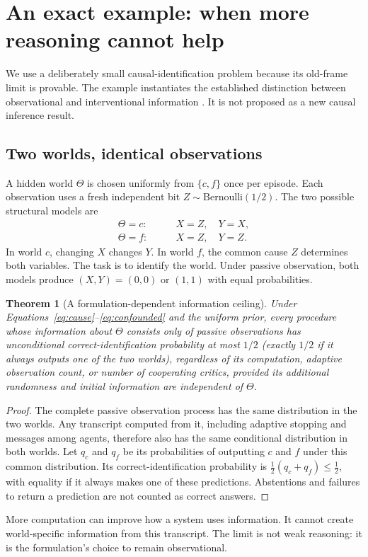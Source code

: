 \documentclass[11pt,letterpaper]{article}
\newtheorem{theorem}{Theorem}[section]
\theoremstyle{remark}\newtheorem{remark}{Remark}[section]
\begin{document}
\section{An exact example: when more reasoning cannot help}
\label{sec:causal}
We use a deliberately small causal-identification problem because its old-frame limit is provable. The example instantiates the established distinction between observational and interventional information \citep{pearl2009causal}. It is not proposed as a new causal inference result.

\subsection{Two worlds, identical observations}
A hidden world $\Theta$ is chosen uniformly from $\{c,f\}$ once per episode. Each observation uses a fresh independent bit $Z\sim\mathrm{Bernoulli}(1/2)$. The two possible structural models are
\begin{align}
\Theta=c:&\qquad X=Z,\quad Y=X,\label{eq:cause}\\
\Theta=f:&\qquad X=Z,\quad Y=Z.\label{eq:confounded}
\end{align}
In world $c$, changing $X$ changes $Y$. In world $f$, the common cause $Z$ determines both variables. The task is to identify the world. Under passive observation, both models produce $(X,Y)=(0,0)$ or $(1,1)$ with equal probabilities.

\begin{theorem}[A formulation-dependent information ceiling]
\label{thm:passive}
Under Equations~\eqref{eq:cause}--\eqref{eq:confounded} and the uniform prior, every procedure whose information about $\Theta$ consists only of passive observations has unconditional correct-identification probability at most $1/2$ (exactly $1/2$ if it always outputs one of the two worlds), regardless of its computation, adaptive observation count, or number of cooperating critics, provided its additional randomness and initial information are independent of $\Theta$.
\end{theorem}
\begin{proof}
The complete passive observation process has the same distribution in the two worlds. Any transcript computed from it, including adaptive stopping and messages among agents, therefore also has the same conditional distribution in both worlds. Let $q_c$ and $q_f$ be its probabilities of outputting $c$ and $f$ under this common distribution. Its correct-identification probability is $\tfrac12(q_c+q_f)\leq\tfrac12$, with equality if it always makes one of these predictions. Abstentions and failures to return a prediction are not counted as correct answers.
\end{proof}
More computation can improve how a system uses information. It cannot create world-specific information from this transcript. The limit is not weak reasoning: it is the formulation's choice to remain observational.
\end{document}
